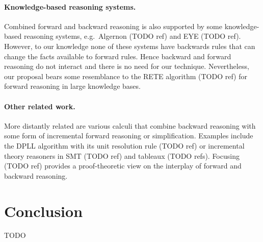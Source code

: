 \documentclass[runningheads]{llncs}
\newcommand{\xcom}[1]{{\color{cyan}{Xavier: #1}} }
\newcommand{\jcom}[1]{{\color{orange}{Jannis: #1}} }
\begin{document}
\paragraph{Knowledge-based reasoning systems.}
Combined forward and backward reasoning is also supported by some knowledge-based reasoning systems, e.g.\ Algernon (TODO ref) and EYE (TODO ref).
However, to our knowledge none of these systems have backwards rules that can change the facts available to forward rules.
Hence backward and forward reasoning do not interact and there is no need for our technique.
Nevertheless, our proposal bears some resemblance to the RETE algorithm (TODO ref) for forward reasoning in large knowledge bases.

\paragraph{Other related work.}
More distantly related are various calculi that combine backward reasoning with some form of incremental forward reasoning or simplification.
Examples include the DPLL algorithm with its unit resolution rule (TODO ref) or incremental theory reasoners in SMT (TODO ref) and tableaux (TODO refs).
Focusing (TODO ref) provides a proof-theoretic view on the interplay of forward and backward reasoning.

\jcom{auto2}
\jcom{Mention ACL2 forward rule triggers}

\section{Conclusion}

\xcom{Do we want to add potential improvements? Like an index closer to the naive algorithm.}

TODO
\end{document}

